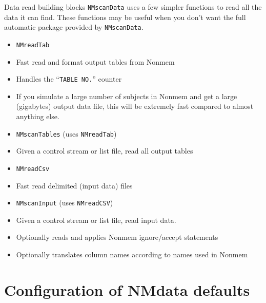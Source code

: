 \documentclass[
  8pt,
  ignorenonframetext,
  aspectratio=169]{beamer}
\providecommand{\tightlist}{%
  \setlength{\itemsep}{0pt}\setlength{\parskip}{0pt}}
\begin{document}
\begin{frame}[fragile]{Data read building blocks}
\protect\hypertarget{data-read-building-blocks}{}
\texttt{NMscanData} uses a few simpler functions to read all the data it
can find. These functions may be useful when you don't want the full
automatic package provided by \texttt{NMscanData}.

\begin{itemize}
\tightlist
\item
  \texttt{NMreadTab}
\item
  Fast read and format output tables from Nonmem
\item
  Handles the ``\texttt{TABLE\ NO.}'' counter
\item
  If you simulate a large number of subjects in Nonmem and get a large
  (gigabytes) output data file, this will be extremely fast compared to
  almost anything else.
\item
  \texttt{NMscanTables} (uses \texttt{NMreadTab})
\item
  Given a control stream or list file, read all output tables
\item
  \texttt{NMreadCsv}
\item
  Fast read delimited (input data) files
\item
  \texttt{NMscanInput} (uses \texttt{NMreadCSV})
\item
  Given a control stream or list file, read input data.
\item
  Optionally reads and applies Nonmem ignore/accept statements
\item
  Optionally translates column names according to names used in Nonmem
\end{itemize}
\end{frame}

\hypertarget{configuration-of-nmdata-defaults}{%
\section{Configuration of NMdata
defaults}\label{configuration-of-nmdata-defaults}}
\end{document}
